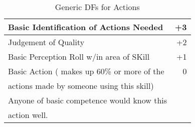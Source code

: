 \begin{table}
	\begin{tabular}{lr}
	Basic Identification of Actions Needed		  & +3	\\ 
\hline
	Judgement of Quality                          & +2	\\
	Basic Perception Roll w/in area of SKill      & +1	\\
	Basic Action ( makes up 60\% or more of the   & 0	\\  
	actions made by someone using this skill)     &      \\
	Anyone of basic competence would know this   &      \\
	action well.                                  &      \\
	\end{tabular}
    \caption{Generic DFs for Actions}
\end{table}
